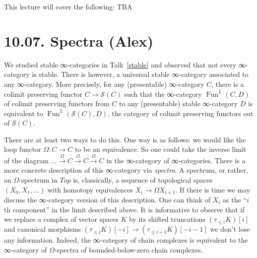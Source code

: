 \documentclass[a4paper]{amsart}
\numberwithin{figure}{section}
\theoremstyle{theorem}
\theoremstyle{definition}
\newcommand{\Top}{{Top}}
\newcommand{\Sp}{{\mathcal{S}}}
\DeclareMathOperator{\Fun}{Fun}
\begin{document}
This lecture will cover the following: TBA



%
%
%

\section{10.07. Spectra (Alex)}

We studied stable ∞-categories in Talk~\ref{stable} and observed that not every ∞-category is stable. There is however, a universal stable ∞-category associated to any ∞-category. More precisely, for any (presentable) ∞-category $C$, there is a colimit preserving functor  $C → \Sp(C)$ such that the ∞-category $\Fun^L(C, D)$ of colimit preserving functors from $C$ to any (presentable) stable ∞-category $D$ is equivalent to $\Fun^L(\Sp(C), D)$, the category of colimit preserving functors out of $\Sp(C)$.

There are at least two ways to do this. One way is as follows: we would like the loop functor $\Omega: C \to C$ to be an equivalence. So one could take the inverse limit of the diagram $\dots \stackrel{\Omega}{\to} C \stackrel{\Omega}{\to} C \stackrel{\Omega}{\to} C$ in the ∞-category of ∞-categories. There is a more concrete description of this ∞-category via \emph{spectra}. A spectrum, or rather, an $\Omega$-spectrum in $\Top$ is, classically, a sequence of topological spaces $(X_0, X_1, \dots)$ with homotopy equivalences $X_i → \Omega X_{i+1}$. If there is time we may discuss the ∞-category version of this description. One can think of $X_i$ as the ``$i$th component'' in the limit described above. It is informative to observe that if we replace a complex of vector spaces $K$ by its shifted truncations $(\tau_{\leq i}K)[i]$ and canonical morphisms $(\tau_{\leq i}K)[{-}i] \to (\tau_{\leq {i+1}}K)[{-}i{-}1]$ we don't lose any information. Indeed, the ∞-category of chain complexes is equivalent to the ∞-category of $\Omega$-spectra of bounded-below-zero chain complexes.
\end{document}
